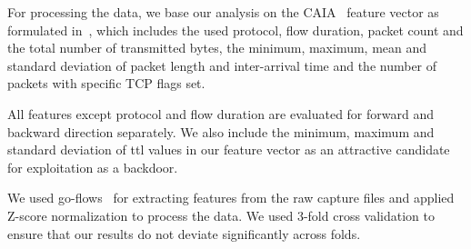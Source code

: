 \documentclass[9pt,sigconf,letterpaper,dvipsnames\ifx\removeHeaders\tempYes ,nonacm\fi]{acmart}
\begin{document}
For processing the data, we base our analysis on the CAIA~\cite{williams_preliminary_2006} feature vector as formulated in~\cite{meghdouri_analysis_2018}, which includes the used protocol, flow duration, packet count and the total number of transmitted bytes, the minimum, maximum, mean and standard deviation of packet length and inter-arrival time and the number of packets with specific TCP flags set.

All features except protocol and flow duration are evaluated for forward and backward direction separately.
We also include the minimum, maximum and standard deviation of \gls{ttl} values in our feature vector as an attractive candidate for exploitation as a backdoor. %

We used go-flows~\cite{vormayr_go-flows_2019}
for extracting features from the raw capture files and applied Z-score normalization to process the data. We used 3-fold cross validation to ensure that our results do not deviate significantly across folds.

\end{document}
